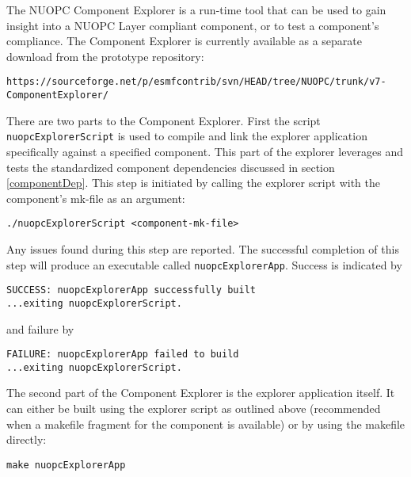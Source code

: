 %

\label{Explorer}

The NUOPC Component Explorer is a run-time tool that can be used to gain insight into a NUOPC Layer compliant component, or to test a component's compliance. The Component Explorer is currently available as a separate download from the prototype repository:

\begin{verbatim}
https://sourceforge.net/p/esmfcontrib/svn/HEAD/tree/NUOPC/trunk/v7-ComponentExplorer/
\end{verbatim}

There are two parts to the Component Explorer. First the script {\tt nuopcExplorerScript} is used to compile and link the explorer application specifically against a specified component. This part of the explorer leverages and tests the standardized component dependencies discussed in section \ref{componentDep}. This step is initiated by calling the explorer script with the component's mk-file as an argument:

\begin{verbatim}
./nuopcExplorerScript <component-mk-file>
\end{verbatim}

Any issues found during this step are reported. The successful completion of this step will produce an executable called {\tt nuopcExplorerApp}. Success is indicated by 

\begin{verbatim}
SUCCESS: nuopcExplorerApp successfully built
...exiting nuopcExplorerScript.
\end{verbatim}

and failure by

\begin{verbatim}
FAILURE: nuopcExplorerApp failed to build
...exiting nuopcExplorerScript.
\end{verbatim}

The second part of the Component Explorer is the explorer application itself. It can either be built using the explorer script as outlined above (recommended when a makefile fragment for the component is available) or by using the makefile directly:

\begin{verbatim}
make nuopcExplorerApp
\end{verbatim}

